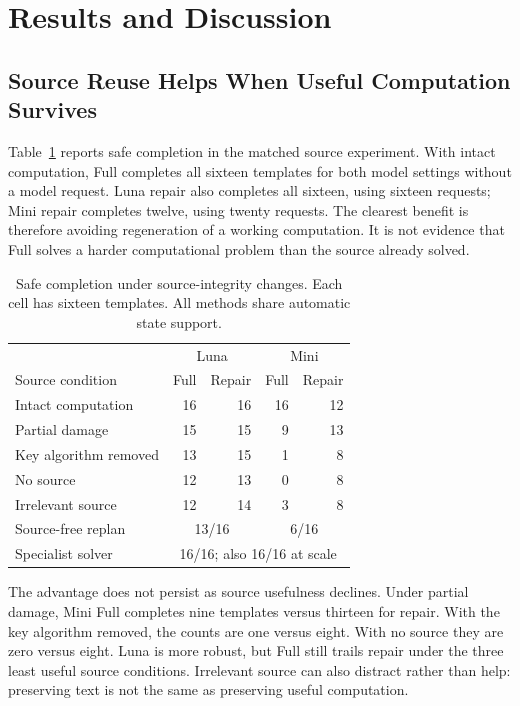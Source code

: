 \documentclass[conference]{IEEEtran}
\newcommand{\smalltable}{\fontsize{8}{9.5}\selectfont}
\begin{document}
\section{Results and Discussion}
\subsection{Source Reuse Helps When Useful Computation Survives}
Table~\ref{tab:source} reports safe completion in the matched source experiment. With intact computation, Full completes all sixteen templates for both model settings without a model request. Luna repair also completes all sixteen, using sixteen requests; Mini repair completes twelve, using twenty requests. The clearest benefit is therefore avoiding regeneration of a working computation. It is not evidence that Full solves a harder computational problem than the source already solved.

\begin{table}[t]
\centering\smalltable
\caption{Safe completion under source-integrity changes. Each cell has sixteen templates. All methods share automatic state support.}
\label{tab:source}
\begin{tabular}{lrrrr}
\toprule
& \multicolumn{2}{c}{Luna} & \multicolumn{2}{c}{Mini} \\
Source condition & Full & Repair & Full & Repair \\
\midrule
Intact computation & 16 & 16 & 16 & 12 \\
Partial damage & 15 & 15 & 9 & 13 \\
Key algorithm removed & 13 & 15 & 1 & 8 \\
No source & 12 & 13 & 0 & 8 \\
Irrelevant source & 12 & 14 & 3 & 8 \\
\midrule
Source-free replan & \multicolumn{2}{c}{13/16} & \multicolumn{2}{c}{6/16} \\
Specialist solver & \multicolumn{4}{c}{16/16; also 16/16 at scale} \\
\bottomrule
\end{tabular}
\end{table}

The advantage does not persist as source usefulness declines. Under partial damage, Mini Full completes nine templates versus thirteen for repair. With the key algorithm removed, the counts are one versus eight. With no source they are zero versus eight. Luna is more robust, but Full still trails repair under the three least useful source conditions. Irrelevant source can also distract rather than help: preserving text is not the same as preserving useful computation.
\end{document}
